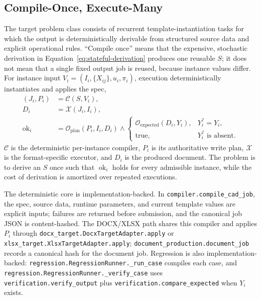 \subsection{Compile-Once, Execute-Many}
\label{sec:design:compile-once}

The target problem class consists of recurrent template-instantiation tasks for which
the output is deterministically derivable from structured source data and explicit
operational rules. ``Compile once'' means that the expensive, stochastic derivation in
Equation~\ref{eq:stateful-derivation} produces one reusable $S$; it does not mean that a
single fixed output job is reused, because instance values differ. For instance input
$V_i=(I_i,\{X_{ij}\},u_i,\pi_i)$, execution deterministically instantiates and applies
the spec,
\begin{align}
(J_i,P_i) &= \mathcal{C}(S,V_i), \\
D_i &= \mathcal{X}(J_i,I_i), \\
\operatorname{ok}_i
  &= \mathcal{O}_{\mathrm{plan}}(P_i,I_i,D_i)
     \land
     \begin{cases}
       \mathcal{O}_{\mathrm{expected}}(D_i,Y_i), & Y_i^{?}=Y_i,\\
       \mathrm{true}, & Y_i^{?}\text{ is absent}.
     \end{cases}
\end{align}
$\mathcal{C}$ is the deterministic per-instance compiler, $P_i$ is its authoritative
write plan, $\mathcal{X}$ is the format-specific executor, and $D_i$ is the produced
document. The problem is to derive an $S$ once such that $\operatorname{ok}_i$ holds
for every admissible instance, while the cost of derivation is amortized over repeated
executions.

The deterministic core is implementation-backed. In
\texttt{compiler.compile\_cad\_job}, the spec, source data, runtime parameters, and
current template values are explicit inputs; failures are returned before submission,
and the canonical job JSON is content-hashed. The DOCX/XLSX path shares this compiler
and applies $P_i$ through \texttt{docx\_target.DocxTargetAdapter.apply} or
\texttt{xlsx\_target.XlsxTargetAdapter.apply};
\texttt{document\_production.document\_job} records a
canonical hash for the document job. Regression is also implementation-backed:
\texttt{regression.RegressionRunner.\_run\_case} compiles each case, and
\texttt{regression.RegressionRunner.\_verify\_case} uses
\texttt{verification.verify\_output} plus
\texttt{verification.compare\_expected} when $Y_i$ exists.

